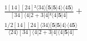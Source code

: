 \documentclass[varwidth, border=5pt]{standalone}
\begin{document}
\begin{my}
$\begin{gathered}
\scriptscriptstyle\frac{1[14][24]²⟨34⟩[𝟓|𝟓|4⟩⟨4𝟓⟩}{[34]⟨4|2+3|4]²⟨4|𝟓|4]} +\\
\scriptscriptstyle\frac{1/2[14][24]⟨34⟩[𝟓|𝟓|4⟩⟨4𝟓⟩}{⟨24⟩[34]⟨4|2+3|4]⟨4|𝟓|4]} \phantom{+}
\end{gathered}$
\end{my}
\end{document}
